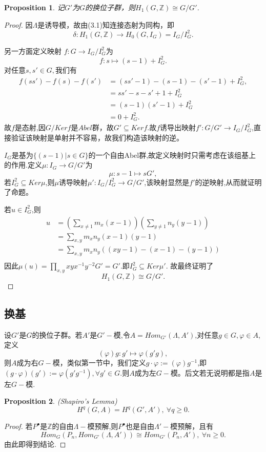 \documentclass[UTF8]{article}
\newtheorem{prop}{Proposition}[section]
\begin{document}
\begin{prop}
	记$G'$为$G$的换位子群，则$H_{1}(G,\mathbb{Z})\cong G/G'$.
\end{prop}
\begin{proof}
	因$\Lambda$是诱导模，故由(3.1)知连接态射为同构，即
	$$
	\delta:H_{1}(G,\mathbb{Z})\rightarrow H_{0}(G,I_{G})=I_{G}/I_{G}^{2}.$$
	
	另一方面定义映射
	$f:G\rightarrow I_{G}/I_{G}^{2}$为
	$$
	f:s\mapsto (s-1)+I_{G}^{2}.
	$$
	对任意$s,s'\in G,$我们有
	\[
	\begin{split}
		f(ss')-f(s)-f(s')&=(ss'-1)-(s-1)-(s'-1)+I_{G}^{2},\\
		&=ss'-s-s'+1 +I_{G}^{2}\\
		&=(s-1)(s'-1)+I_{G}^{2} \\
		&=0+I_{G}^{2}.
	\end{split}
	\]
	故$f$是态射,因$G/Kerf$是$Abel$群，故$G'\subseteq Kerf$.故$f$诱导出映射$f':G/G'\rightarrow I_{G}/I_{G}^{2}$,直接验证该映射是单射并不容易，故我们构造该映射的逆。
	
	$I_{G}$是基为$\{(s-1)|s\in G\}$的一个自由Abel群,故定义映射时只需考虑在该组基上的作用.定义$\mu:I_{G}\rightarrow G/G'$为
	$$
	\mu:s-1\mapsto sG',
	$$
	若$I_{G}^{2}\subseteq Ker\mu$,则$\mu$诱导映射$\mu':I_{G}/I_{G}^{2}\rightarrow G/G'$,该映射显然是$f'$的逆映射,从而就证明了命题。
	
	若$u\in I_{G}^{2}$,则
	\[
	\begin{split}
	u&=(\sum_{x\neq 1}m_{x}(x-1))(\sum_{y\neq 1}n_{y}(y-1)) \\
	&=\sum_{x,y}m_{x}n_{y}(x-1)(y-1) \\
	&=\sum_{x,y}m_{x}n_{y}\left((xy-1)-(x-1)-(y-1)\right) \\
	\end{split}
	\]
	因此$\mu(u)=\prod_{x,y}xyx^{-1}y^{-2}G'=G'$.即$I_{G}^{2}\subseteq Ker\mu'$.
	故最终证明了$$
	H_{1}(G,\mathbb{Z})\cong G/G'.
	$$
\end{proof}
\subsection{换基}

设$G'$是$G$的换位子群。若$A'$是$G'-$模,令$A=Hom_{G'}(\Lambda,A')$,对任意$g\in G,\varphi\in A$,定义
$$
(\varphi)g:g'\mapsto \varphi(g'g),
$$
则$A$成为右$G-$模，类似第一节中，我们定义$g\cdot \varphi:=(\varphi)g^{-1}$,即$(g\cdot \varphi)(g'):=\varphi(g'g^{-1}),\forall g'\in G$.则$A$成为左$G-$模。后文若无说明都是指$A$是左$G-$模.
\begin{prop}
	(Shapiro's Lemma) $$H^{q}(G,A)=H^{q}(G',A') , \ \forall q\geq 0.$$
\end{prop}
\begin{proof}
	若$P^{\bullet}$是$\mathbb{Z}$的自由$\Lambda-$模预解,则$P^{\bullet}$也是自由$\Lambda'-$模预解，且有$$
	Hom_{G}(P_{n},Hom_{G'}(\Lambda,A'))\cong Hom_{G'}(P_{n},A'),\ \forall n\geq 0.
	$$
	由此即得到结论.
\end{proof}
\end{document}
